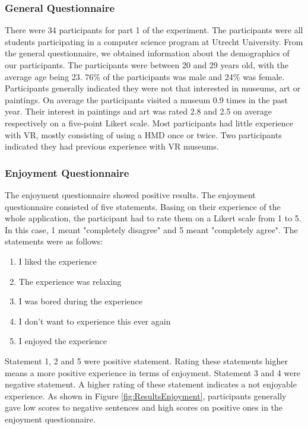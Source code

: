 \documentclass[a4paper]{article}
\begin{document}
\subsubsection{General Questionnaire}
There were 34 participants for part 1 of the experiment. The participants were all students participating in a computer science program at Utrecht University. From the general questionnaire, we obtained information about the demographics of our participants. The participants were between 20 and 29 years old, with the average age being 23. 76\% of the participants was male and 24\% was female. Participants generally indicated they were not that interested in museums, art or paintings. On average the participants visited a museum 0.9 times in the past year. Their interest in paintings and art was rated 2.8 and 2.5 on average respectively on a five-point Likert scale. Most participants had little experience with VR, mostly consisting of using a HMD once or twice. Two participants indicated they had previous experience with VR museums.

\subsubsection{Enjoyment Questionnaire}
The enjoyment questionnaire showed positive results. The enjoyment questionnaire consisted of five statements. Basing on their experience of the whole application, the participant had to rate them on a Likert scale from 1 to 5. In this case, 1 meant "completely disagree" and 5 meant "completely agree". The statements were as follows:

\begin{enumerate}
\item I liked the experience
\item The experience was relaxing
\item I was bored during the experience
\item I don't want to experience this ever again
\item I enjoyed the experience
\end{enumerate}

Statement 1, 2 and 5 were positive statement. Rating these statements higher means a more positive experience in terms of enjoyment. Statement 3 and 4 were negative statement. A higher rating of these statement indicates a not enjoyable experience. As shown in Figure \ref{fig:ResultsEnjoyment}, participants generally gave low scores to negative sentences and high scores on positive ones in the enjoyment questionnaire. 
\end{document}

